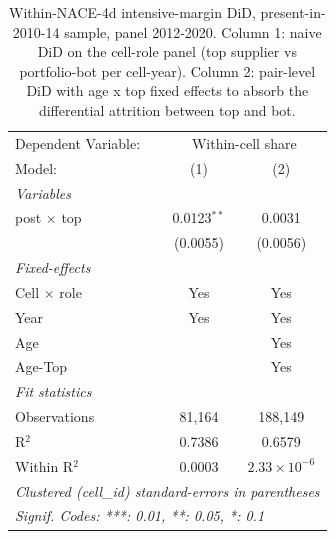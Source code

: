 
\begin{table}[htbp]
   \caption{\label{tab:phase4_within_intensive_did_coefs} Within-NACE-4d intensive-margin DiD, present-in-2010-14 sample, panel 2012-2020. Column 1: naive DiD on the cell-role panel (top supplier vs portfolio-bot per cell-year). Column 2: pair-level DiD with age x top fixed effects to absorb the differential attrition between top and bot.}
   \centering
   \begin{tabular}{lcc}
      \tabularnewline \midrule \midrule
      Dependent Variable: & \multicolumn{2}{c}{Within-cell share}\\
      Model:              & (1)           & (2)\\  
      \midrule
      \emph{Variables}\\
      post $\times$ top   & 0.0123$^{**}$ & 0.0031\\   
                          & (0.0055)      & (0.0056)\\   
      \midrule
      \emph{Fixed-effects}\\
      Cell $\times$ role  & Yes           & Yes\\  
      Year                & Yes           & Yes\\  
      Age                 &               & Yes\\  
      Age-Top             &               & Yes\\  
      \midrule
      \emph{Fit statistics}\\
      Observations        & 81,164        & 188,149\\  
      R$^2$               & 0.7386        & 0.6579\\  
      Within R$^2$        & 0.0003        & $2.33\times 10^{-6}$\\   
      \midrule \midrule
      \multicolumn{3}{l}{\emph{Clustered (cell\_id) standard-errors in parentheses}}\\
      \multicolumn{3}{l}{\emph{Signif. Codes: ***: 0.01, **: 0.05, *: 0.1}}\\
   \end{tabular}
\end{table}


